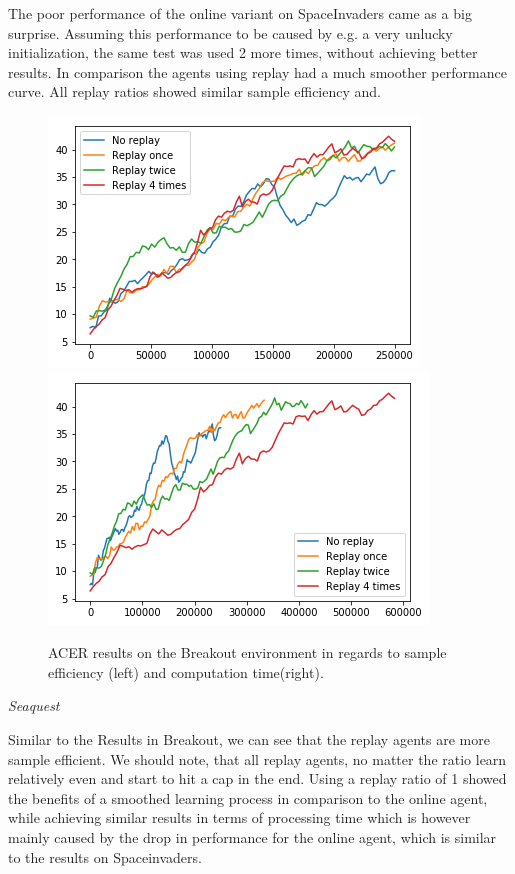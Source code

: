 The poor performance of the online variant on SpaceInvaders came as a big surprise. Assuming this performance to be caused by e.g. a very unlucky initialization, the same test was used 2 more times, without achieving better results. In comparison the agents using replay had a much smoother performance curve.
All replay ratios showed similar sample efficiency and.
\begin{figure}[h]
\includegraphics[scale=0.5]{bilder/seaquestbyonline.png}
\includegraphics[scale=0.5]{bilder/seaquestbytime.png}
\caption{ACER results on the Breakout environment in regards to sample efficiency (left) and computation time(right).}
\label{seafig}
\end{figure}

\textit{Seaquest}

Similar to the Results in Breakout, we can see that the replay agents are more sample efficient. We should note, that all replay agents, no matter the ratio learn relatively even and start to hit a cap in the end.
Using a replay ratio of 1 showed the benefits of a smoothed learning process in comparison to the online agent, while achieving similar results in terms of processing time which is however mainly caused by the drop in performance for the online agent, which is similar to the results on Spaceinvaders.

